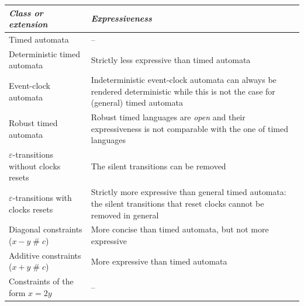 \begin{table}[htbp]
\centering
\footnotesize
\begin{tabular}{|p{5cm}|p{7.5cm}|}

    \hline

    \textit{Class or extension} &
    \textit{Expressiveness} \\

    \hline \hline

    Timed automata &
		-- \\
		
    \hline

    Deterministic timed automata &
    Strictly less expressive than timed automata \\

    \hline

    Event-clock automata &
    Indeterministic event-clock automata can always be rendered deterministic while this is not the case for (general) timed automata \cite{RALF94} \\

    \hline

    Robust timed automata &
    Robust timed languages are \emph{open} and their expressiveness is not comparable with the one of timed languages \cite{RAPM04} \\

    \hline \hline

    $\varepsilon$-transitions without clocks resets &
    The silent transitions can be removed \cite{VDPG97} \\

    \hline

    $\varepsilon$-transitions with clocks resets &
    Strictly more expressive than general timed automata: the silent transitions that reset clocks cannot be removed in general \cite{VDPG97,BBVD+99,LSV:07:12} \\

    \hline

    Diagonal constraints ($x - y \;\#\; c$)&
    More concise than timed automata, but not more expressive \cite{BBVD+99} \\

    \hline

    Additive constraints ($x + y \;\#\; c$) &
    More expressive than timed automata \\

    \hline
    
    Constraints of the form $x = 2y$ &
    -- \\
    

\end{tabular}
\end{table}
